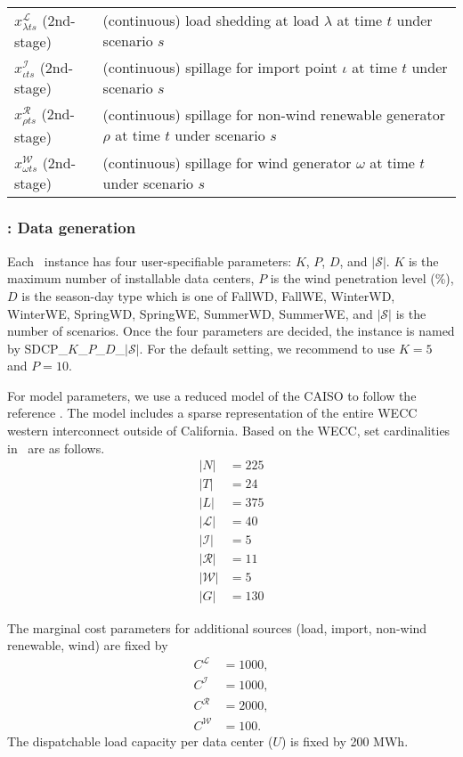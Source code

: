 \begin{table}[H]
{\begin{tabular}{ll}
			$x_{\lambda ts}^\mathcal{L}$	(2nd-stage) & (continuous) load shedding at load $\lambda$ at time $t$ under scenario $s$	\\
			$x_{\iota ts}^\mathcal{I}$	(2nd-stage) &	(continuous) spillage for import point $\iota$ at time $t$ under scenario $s$\\
			$x_{\rho ts}^\mathcal{R}$ (2nd-stage)	& (continuous) spillage for non-wind renewable generator $\rho$ at time $t$ under scenario $s$  	\\
			$x_{\omega ts}^\mathcal{W}$ (2nd-stage)	& (continuous) spillage for wind generator $\omega$ at time $t$ under scenario $s$ 	\\
			\hline
		\end{tabular}
	}
\end{table}

\subsubsection{\sdcp: Data generation}
Each \sdcp\ instance has four user-specifiable parameters: $K$, $P$, $D$, and $|\mathcal{S}|$. $K$ is the maximum number of installable data centers, $P$ is the wind penetration level (\%), $D$ is the season-day type which is one of FallWD, FallWE, WinterWD, WinterWE, SpringWD, SpringWE, SummerWD, SummerWE, and $|\mathcal{S}|$ is the number of scenarios. Once the four parameters are decided, the instance is named by SDCP\_$K$\_$P$\_$D$\_$|\mathcal{S}|$. For the default setting, we recommend to use $K=5$ and $P=10$.

For model parameters, we use a reduced model of the CAISO to follow the reference \cite{journal:KYZC2017}. The model includes a sparse representation of the entire WECC western interconnect outside of California. 
Based on the WECC, set cardinalities in \sdcp\ are as follows.
\begin{align*}
|N|&=225 \\
|T|&=24 \\
|L|&=375 \\
|\mathcal{L}|&=40\\
|\mathcal{I}|&=5\\
|\mathcal{R}|&=11\\
|\mathcal{W}|&=5\\
|G|&=130
\end{align*}

The marginal cost parameters for additional sources (load, import, non-wind renewable, wind) are fixed by
\begin{align*}
C^\mathcal{L}&=1000,\\
C^\mathcal{I}&=1000,\\
C^\mathcal{R}&=2000,\\
C^\mathcal{W}&=100.
\end{align*}
The dispatchable load capacity per data center ($U$) is fixed by 200 MWh.

